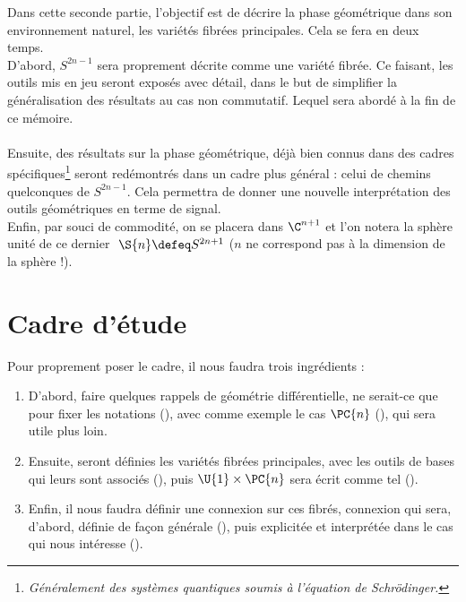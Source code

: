 
Dans cette seconde partie, l'objectif est de décrire la phase géométrique dans son environnement naturel, les variétés fibrées principales. Cela se fera en deux temps.
\\
D'abord, $S^{2n-1}$ sera proprement décrite comme une variété fibrée. Ce faisant, les outils mis en jeu seront exposés avec détail, dans le but de simplifier la généralisation des résultats au cas non commutatif. Lequel sera abordé à la fin de ce mémoire.
\\ \\
Ensuite, des résultats sur la phase géométrique, déjà bien connus dans des cadres spécifiques\footnote{\itshape
	Généralement des systèmes quantiques soumis à l'équation de Schrödinger.} 
\cite{berry_quantal_1997, bohm_geometric_2003, mukunda_quantum_1993, chruscinski_geometric_2004} seront redémontrés dans un cadre plus général : celui de chemins quelconques de $S^{2n-1}$. Cela permettra de donner une nouvelle interprétation des outils géométriques en terme de signal.
\\

Enfin, par souci de commodité, on se placera dans $\C^{n+1}$ et l'on notera la sphère unité de ce dernier $\ \S{n} \defeq S^{2n+1}$ ($n$ ne correspond pas à la dimension de la sphère !).

\section{Cadre d'étude}\label{sec:cadre_geodiff}

Pour proprement poser le cadre, il nous faudra trois ingrédients :
\begin{enumerate}
	
	\item D'abord, faire quelques rappels de géométrie différentielle, ne serait-ce que pour fixer les notations (), avec comme exemple le cas $\PC{n}$ (), qui sera utile plus loin. 
	
	\item Ensuite, seront définies les variétés fibrées principales, avec les outils de bases qui leurs sont associés (), puis $\U{1}\times \PC{n}$ sera écrit comme tel ().
	
	\item Enfin, il nous faudra définir une connexion sur ces fibrés, connexion qui sera, d'abord, définie de façon générale (), puis explicitée et interprétée dans le cas qui nous intéresse ().
	
\end{enumerate}



